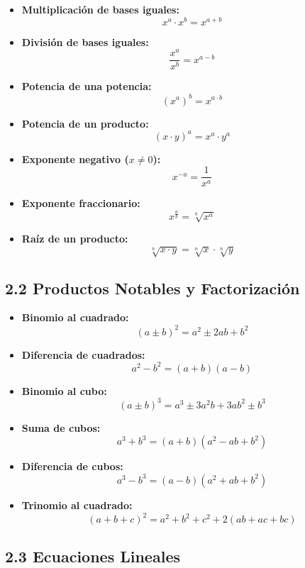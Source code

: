 \documentclass[11pt,a4paper]{article}
\begin{document}
\begin{itemize}
  \item \textbf{Multiplicación de bases iguales:}
  \[
    x^a \cdot x^b = x^{a + b}
  \]
  \item \textbf{División de bases iguales:}
  \[
    \frac{x^a}{x^b} = x^{a - b}
  \]
  \item \textbf{Potencia de una potencia:}
  \[
    (x^a)^b = x^{a \cdot b}
  \]
  \item \textbf{Potencia de un producto:}
  \[
    (x \cdot y)^a = x^a \cdot y^a
  \]
  \item \textbf{Exponente negativo ($x \ne 0$):}
  \[
    x^{-a} = \frac{1}{x^a}
  \]
  \item \textbf{Exponente fraccionario:}
  \[
    x^{\frac{a}{b}} = \sqrt[b]{x^a}
  \]
  \item \textbf{Raíz de un producto:}
  \[
    \sqrt[n]{x \cdot y} = \sqrt[n]{x} \cdot \sqrt[n]{y}
  \]
\end{itemize}

\subsection*{2.2 Productos Notables y Factorización}

\begin{itemize}
  \item \textbf{Binomio al cuadrado:}
  \[
    (a \pm b)^2 = a^2 \pm 2ab + b^2
  \]
  \item \textbf{Diferencia de cuadrados:}
  \[
    a^2 - b^2 = (a + b)(a - b)
  \]
  \item \textbf{Binomio al cubo:}
  \[
    (a \pm b)^3 = a^3 \pm 3a^2b + 3ab^2 \pm b^3
  \]
  \item \textbf{Suma de cubos:}
  \[
    a^3 + b^3 = (a + b)(a^2 - ab + b^2)
  \]
  \item \textbf{Diferencia de cubos:}
  \[
    a^3 - b^3 = (a - b)(a^2 + ab + b^2)
  \]
  \item \textbf{Trinomio al cuadrado:}
  \[
    (a + b + c)^2 = a^2 + b^2 + c^2 + 2(ab + ac + bc)
  \]
\end{itemize}

\subsection*{2.3 Ecuaciones Lineales}
\end{document}
